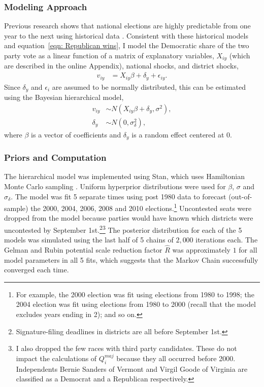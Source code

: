 \documentclass[12pt,final,fleqn]{article}
\theoremstyle{plain}
\begin{document}
\subsubsection{Modeling Approach}
Previous research shows that national elections are highly predictable from one year to the next using historical data \citep[e.g.][]{campbell1992forecasting, gelman1993american, kastellec2008predicting}. Consistent with these historical models and equation~\ref{eqn: Republican wins}, I model the Democratic share of the two party vote as a linear function of a matrix of explanatory variables, $X_{iy}$ (which are described in the online Appendix), national shocks, and district shocks,
\begin{align}
v_{iy}&= X_{iy}\beta + \delta_y + \epsilon_{iy}.
\end{align}
Since $\delta_y$ and $\epsilon_i$ are assumed to be normally distributed, this can be estimated using the Bayesian hierarchical model,
\begin{align}
v_{iy} &\sim N\left(X_{iy}\beta + \delta_y,  \sigma^2\right), \label{eqn: hierarchical linear model} \\
\delta_y &\sim N(0, \sigma^2_\delta), \label{eqn: hierarchical linear model time effects}
\end{align}
where $\beta$ is a vector of coefficients and $\delta_y$ is a random effect centered at 0. 

\subsubsection{Priors and Computation}
The hierarchical model was implemented using Stan, which uses Hamiltonian Monte Carlo sampling \citep{dev2016rstan}. Uniform hyperprior distributions were used for $\beta$, $\sigma$ and $\sigma_\delta$. The model was fit 5 separate times using post 1980 data to forecast (out-of-sample) the 2000, 2004, 2006, 2008 and 2010 elections.\footnote{For example, the 2000 election was fit using elections from 1980 to 1998; the 2004 election was fit using elections from 1980 to 2000 (recall that the model excludes years ending in 2); and so on.} Uncontested seats were dropped from the model because parties would have known which districts were uncontested by September 1st.\footnote{Signature-filing deadlines in districts are all before September 1st.}\footnote{I also dropped the few races with third party candidates. These do not impact the calculations of $Q_i^{maj}$ because they all occurred before 2000. Independents Bernie Sanders of Vermont and Virgil Goode of Virginia are classified as a Democrat and a Republican respectively. } The posterior distribution for each of the 5 models was simulated using the last half of 5 chains of $2,000$ iterations each. The Gelman and Rubin potential scale reduction factor $\hat{R}$ was approximately $1$ for all model parameters in all 5 fits, which suggests that the Markov Chain successfully converged each time.
\end{document}
